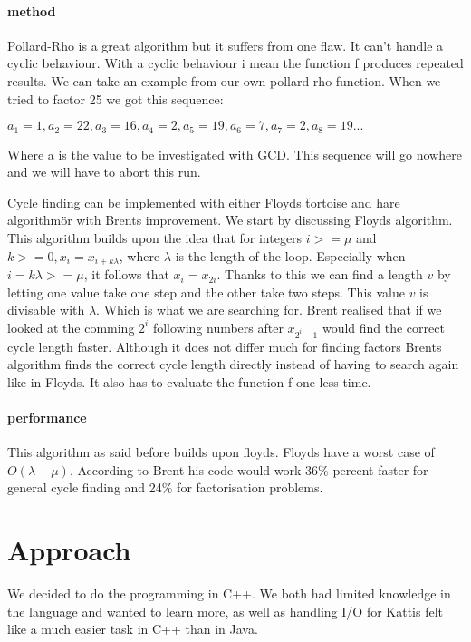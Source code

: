 \documentclass[a4paper, 12pt]{report}
\begin{document}
\subsubsection{method}
Pollard-Rho is a great algorithm but it suffers from one flaw. It can't handle a cyclic behaviour. With a cyclic behaviour i mean the function f produces repeated results. We can take an example from our own pollard-rho function. When we tried to factor 25 we got this sequence:
\begin{center}
$a_1=1, a_2=22, a_3=16, a_4=2, a_5=19, a_6=7, a_7=2, a_8=19...$
\end{center}
Where a is the value to be investigated with GCD. This sequence will go nowhere and we will have to abort this run.

Cycle finding can be implemented with either Floyds \"tortoise and hare algorithm\" or with Brents improvement. We start by discussing Floyds algorithm. This algorithm builds upon the idea that for integers $i >= \mu$ and $k >= 0, x_i = x_{i + k\lambda}$, where $\lambda$ is the length of the loop. Especially when $i = k\lambda >= \mu$, it follows that $x_i = x_{2i}$. Thanks to this we can find a length $v$ by letting one value take one step and the other take two steps. This value $v$ is divisable with $\lambda$. Which is what we are searching for. Brent realised that if we looked at the comming $2^i$ following numbers after $x_{2^i-1}$ would find the correct cycle length faster. Although it does not differ much for finding factors Brents algorithm finds the correct cycle length directly instead of having to search again like in Floyds. It also has to evaluate the function f one less time.

\subsubsection{performance}
This algorithm as said before builds upon floyds. Floyds have a worst case of $O(\lambda + \mu)$. According to Brent his code would work 36\% percent faster for general cycle finding and 24\% for factorisation problems.

\chapter{Approach}
We decided to do the programming in C++. We both had limited knowledge in the language and wanted to learn more, as well as handling I/O for Kattis felt like a much easier task in C++ than in Java. 
\end{document}
